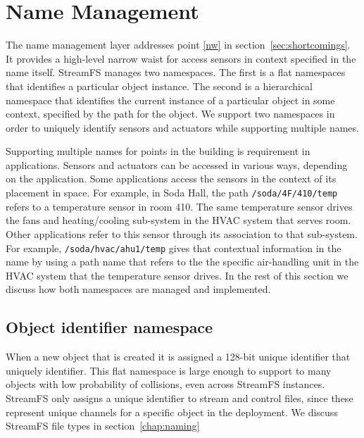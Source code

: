 \section{Name Management}
The name management layer addresses point \ref{nw} in section~\ref{sec:shortcomings}.  It provides a high-level
narrow waist for access sensors in context specified in the name itself.
StreamFS manages two namespaces.  The first is a flat namespaces that identifies a particular
object instance.  The second is a hierarchical namespace that identifies the current instance
of a particular object in some context, specified by the path for the object.  
We support two namespaces in order to uniquely identify sensors and actuators while supporting multiple names.

Supporting multiple names for points in the building is requirement in applications.  Sensors and actuators can be accessed in various 
ways, depending on the application.  Some applications access the sensors in the context of its placement 
in space.  For example, in Soda Hall, the path \texttt{/soda/4F/410/temp} refers to a temperature sensor in room 410.  
The same temperature sensor drives the fans and heating/cooling sub-system in the HVAC system that serves room.
Other applications refer to this sensor through its association to that sub-system.  For example,
\texttt{/soda/hvac/ahu1/temp} gives that contextual information in the name by using a path name that refers to the the specific
air-handling unit in the HVAC system that the temperature sensor drives.
In the rest of this section we discuss how both namespaces are managed and implemented.

\subsection{Object identifier namespace}

When a new object that is created it is assigned a 128-bit unique identifier that uniquely identifier. %
This flat namespace is large enough to support to many objects with low probability of collisions, even across
StreamFS instances.
StreamFS only assigns a unique identifier to stream and control files, since these represent unique channels for a specific 
object in the deployment.  We discuss StreamFS file types in section~\ref{chap:naming}


